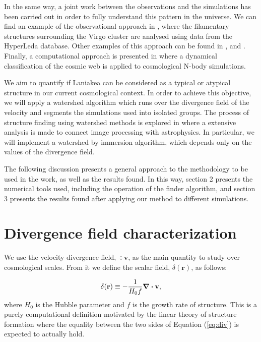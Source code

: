 \documentclass[usenatbib]{mnras}
\begin{document}
In the same way, a joint work between the
observations and the simulations has been carried out in order to
fully understand this pattern in the universe. We can find an example
of the observational approach in \cite{Kim_2016}, where the
filamentary structures surrounding the Virgo cluster are analysed
using data from the HyperLeda database. 
Other examples of this
approach can be found in \cite{Santiago_Bautista_2020},
\cite{van_de_Weygaert_2014} and \cite{Lares_2017}. Finally, a
computational approach is presented in
\cite{10.1111/j.1365-2966.2009.14885.x} where a dynamical
classification of the cosmic web is applied to cosmological N-body
simulations.  

We aim to quantify if Laniakea can be considered as a typical or atypical 
structure in our current cosmological context. In order to achieve
this objective, we will apply a watershed algorithm
\citep{BeucherWatershed1979} which runs over the divergence field of
the velocity and segments the simulations used into isolated
groups. The process of structure finding using watershed methods is
explored in \cite{10.1111/j.1365-2966.2007.12125.x} where a extensive
analysis is made to connect image processing with astrophysics. In
particular, we will implement a watershed by immersion algorithm,
which depends only on the values of the divergence field.  

The following discussion presents a general approach to the
methodology to be used in the work, as well as the results found. In
this way, section 2 presents the numerical tools used, including the
operation of the finder algorithm, and section 3 presents the results
found after applying our method to different simulations. 


\section{Divergence field characterization}

We use the velocity divergence field, $\div \textbf{v}$, as the main quantity to study over cosmological scales.
From it we define the scalar field, $\delta(\textbf{r})$, as follows:

\begin{equation}
    \delta (\textbf{r})\equiv -\frac{1}{H_0 f} \div \bf{v},
    \label{eq:div}
\end{equation}
where $H_0$ is the Hubble parameter and $f$ is the growth rate of structure.
This is a purely computational definition motivated by the linear theory of structure formation where the equality between the two sides of Equation (\ref{eq:div}) is expected to actually hold.
\end{document}
